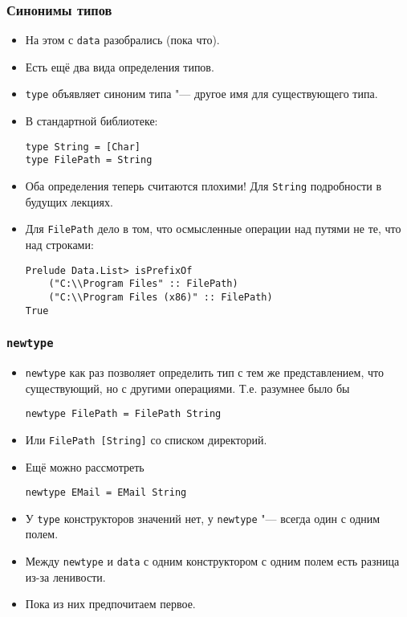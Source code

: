 \documentclass[10pt]{beamer}
\begin{document}
\begin{frame}[fragile]
\frametitle{Синонимы типов}
\begin{itemize}
    \item На этом с \lstinline|data| разобрались (пока что).
    \pause
    \item Есть ещё два вида определения типов.
    \item \lstinline|type| объявляет синоним типа "--- другое имя для существующего типа. 
    \item В стандартной библиотеке:
\begin{lstlisting}
type String = [Char]
type FilePath = String
\end{lstlisting}
    \item Оба определения теперь считаются плохими! Для \lstinline|String| подробности в будущих лекциях.
    \pause 
    \item Для \lstinline|FilePath| дело в том, что осмысленные операции над путями не те, что над строками:
\begin{lstlisting}
Prelude Data.List> isPrefixOf 
    ("C:\\Program Files" :: FilePath) 
    ("C:\\Program Files (x86)" :: FilePath)
True
\end{lstlisting}
\end{itemize}
\end{frame}

\begin{frame}[fragile]
\frametitle{\lstinline|newtype|}
\begin{itemize}
    \item \lstinline|newtype| как раз позволяет определить тип с тем же представлением, что существующий, но с другими операциями. Т.е. разумнее было бы 
\begin{lstlisting}
newtype FilePath = FilePath String
\end{lstlisting}
    \item Или \lstinline|FilePath [String]| со списком директорий.
    \item Ещё можно рассмотреть
\begin{lstlisting}
newtype EMail = EMail String
\end{lstlisting}
    \item У \lstinline|type| конструкторов значений нет, у \lstinline|newtype| "--- всегда один с одним полем.
    \item Между \lstinline|newtype| и \lstinline|data| с одним конструктором с одним полем есть разница из-за ленивости.
    \item Пока из них предпочитаем первое.
\end{itemize}
\end{frame}
\end{document}
